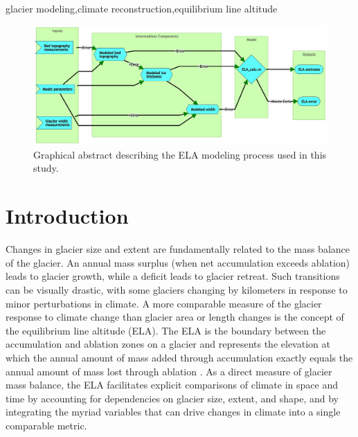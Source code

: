 \documentclass[review]{elsarticle}
\begin{document}
\begin{frontmatter}
\begin{abstract}
\end{abstract}

\begin{keyword}
glacier modeling\sep climate reconstruction\sep equilibrium line altitude
\end{keyword}

\begin{figure}
    \centering
    \includegraphics[width=\textwidth]{Figures/graph-abstract.png}
    \caption{Graphical abstract describing the ELA modeling process used in this study.}
    \label{fig:abstract}
\end{figure}

\end{frontmatter}

\linenumbers


\section{Introduction}\label{sec:intro}

Changes in glacier size and extent are fundamentally related to the mass balance of the glacier.
An annual mass surplus (when net accumulation exceeds ablation) leads to glacier growth, while a deficit leads to glacier retreat.
Such transitions can be visually drastic, with some glaciers changing by kilometers in response to minor perturbations in climate.
A more comparable measure of the glacier response to climate change than glacier area or length changes is the concept of the equilibrium line altitude (ELA).
The ELA is the boundary between the accumulation and ablation zones on a glacier and represents the elevation at which the annual amount of mass added through accumulation exactly equals the annual amount of mass lost through ablation \cite{cuffey_physics_2010}.
As a direct measure of glacier mass balance, the ELA facilitates explicit comparisons of climate in space and time by accounting for dependencies on glacier size, extent, and shape, and by integrating the myriad variables that can drive changes in climate into a single comparable metric.
\end{document}
